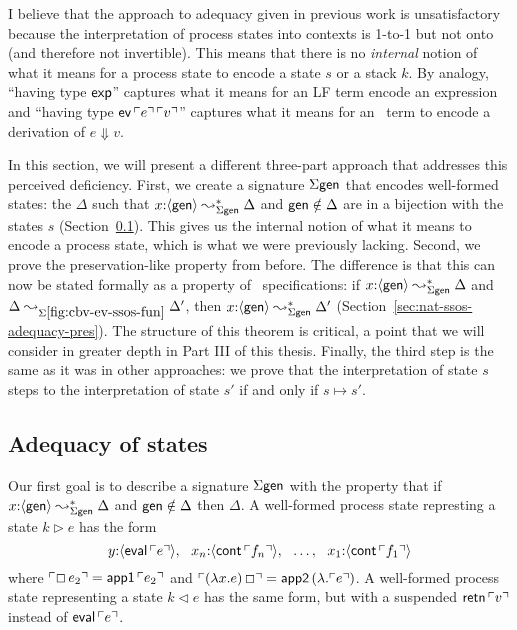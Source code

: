 I believe that the approach to adequacy given in previous work is
unsatisfactory because the interpretation of process states into
contexts is 1-to-1 but not onto (and therefore not invertible).  This
means that there is no {\it internal} notion of what it means for a
process state to encode a state $s$ or a stack $k$. By analogy,
``having type ${\sf exp}$'' captures what it means for an LF term
encode an expression and ``having type ${\sf
  ev}\,{\ulcorner{e}\urcorner}\,{\ulcorner{v}\urcorner}$'' captures what it means for an
\sls~term to encode a derivation of $e \Downarrow v$.

In this section, we will present a different three-part approach that
addresses this perceived deficiency. First, we create a signature
$\Sigma\sf gen$ that encodes well-formed states: the $\Delta$ such
that $x{:}\langle {\sf gen} \rangle \leadsto^*_{\Sigma\sf gen} \Delta$ and ${\sf
  gen} \notin \Delta$ are in a bijection with the states $s$
(Section~\ref{sec:nat-ssos-adequacy-gen}). This gives us the internal
notion of what it means to encode a process state, which is what we
were previously lacking. Second, we prove the preservation-like
property from before. The difference is that this can now be stated
formally as a property of \sls~specifications: if $x{:}\langle {\sf gen} \rangle
\leadsto^*_{\Sigma\sf gen} \Delta$ and $\Delta
\leadsto_{\Sigma\ref{fig:cbv-ev-ssos-fun}} \Delta'$, then $x{:}
\langle {\sf gen} \rangle \leadsto^*_{\Sigma\sf gen} \Delta'$
(Section~\ref{sec:nat-ssos-adequacy-pres}). The structure of this
theorem is critical, a point that we will consider in greater depth in
Part III of this thesis. Finally, the third step is the same as it was
in other approaches: we prove that the interpretation of state $s$
steps to the interpretation of state $s'$ if and only if $s \mapsto s'$.

\subsection{Adequacy of states}
\label{sec:nat-ssos-adequacy-gen}

Our first goal is to describe a signature $\Sigma\sf gen$ with the
property that if $x{:}\langle {\sf gen} \rangle \leadsto^*_{\Sigma\sf gen}
\Delta$ and ${\sf gen} \notin \Delta$ then $\Delta$. A well-formed
process state represting a state $k \rhd e$ has the form
\[
y{:}\langle {{\sf eval}\,{\ulcorner{e}\urcorner}} \rangle, ~~
x_n{:}\langle {{\sf cont}\,{\ulcorner{f_n}\urcorner}} \rangle, ~~
\ldots, ~~
x_1{:}\langle {{\sf cont}\,{\ulcorner{f_1}\urcorner}} \rangle
\]
where ${\ulcorner{\Box\,e_2}\urcorner} = {\sf app1}\,{\ulcorner{e_2}\urcorner}$ and
${\ulcorner{(\lambda x.e)\,\Box}\urcorner} = {\sf app2}\,(\lambda.{\ulcorner{e}\urcorner})$. 
A well-formed process state representing a state $k \lhd e$ has 
the same form, but with a suspended ${\sf retn}\,{\ulcorner{v}\urcorner}$ instead
of ${\sf eval}\,{\ulcorner{e}\urcorner}$. 


